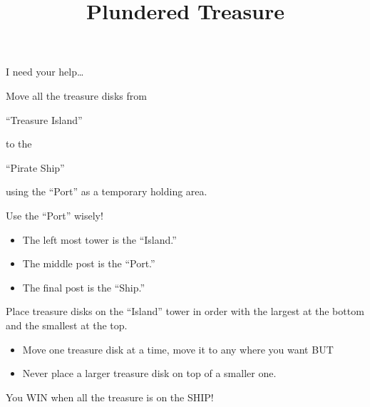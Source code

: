 \documentclass{../exhibit}
\title{Plundered Treasure}
\begin{document}
\begin{context} I need your help\dots


Move all the treasure disks from


\quad ``Treasure Island''

\quad \quad \quad\quad to the


\quad \quad \quad \quad \quad ``Pirate Ship''




using the ``Port'' as a
temporary holding area.


Use the ``Port'' wisely!
\end{context}

\begin{directions}
\begin{itemize}
\item The left most tower is the ``Island.''
\item The middle post is the ``Port.''
\item The final post is the ``Ship.''
\end{itemize}

Place treasure disks on the ``Island'' tower in order with the largest
at the bottom and the smallest at the top.
\begin{itemize}
\item Move one treasure disk at a time, move it to any where you want
  BUT
\item Never place a larger treasure disk on top of a smaller one.
\end{itemize}
You WIN when all the treasure is on the SHIP!
\end{directions}
\end{document}
